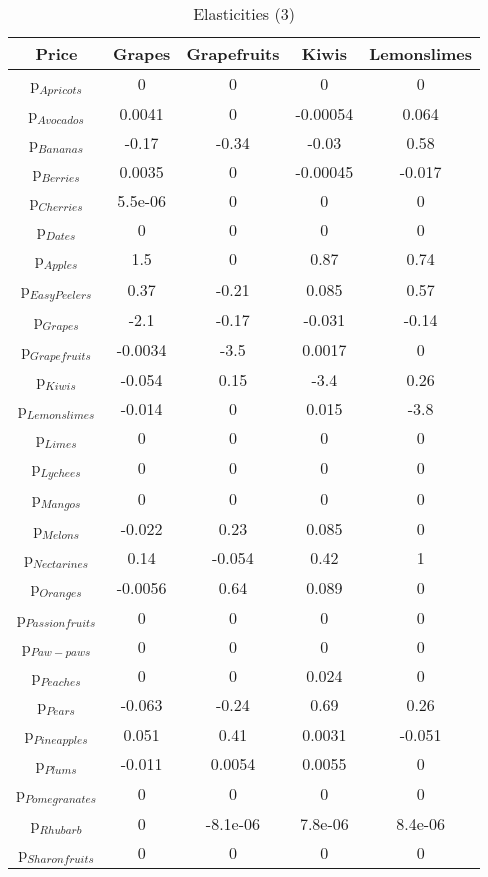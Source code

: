\documentclass[11pt]{article}
\begin{document}
\begin{table}[h]
\caption{Elasticities (3)}
\label{Table: elasticities 3}
\begin{center}
\begin{tabular}{ccccc}
Price & Grapes & Grapefruits & Kiwis & Lemonslimes \\ \hline
p$_{Apricots}$ & 0 & 0 & 0 & 0 \\ 
p$_{Avocados}$ & 0.0041 & 0 & -0.00054 & 0.064 \\ 
p$_{Bananas}$ & -0.17 & -0.34 & -0.03 & 0.58 \\ 
p$_{Berries}$ & 0.0035 & 0 & -0.00045 & -0.017 \\ 
p$_{Cherries}$ & 5.5e-06 & 0 & 0 & 0 \\ 
p$_{Dates}$ & 0 & 0 & 0 & 0 \\ 
p$_{Apples}$ & 1.5 & 0 & 0.87 & 0.74 \\ 
p$_{Easy Peelers}$ & 0.37 & -0.21 & 0.085 & 0.57 \\ 
p$_{Grapes}$ & -2.1 & -0.17 & -0.031 & -0.14 \\ 
p$_{Grapefruits}$ & -0.0034 & -3.5 & 0.0017 & 0 \\ 
p$_{Kiwis}$ & -0.054 & 0.15 & -3.4 & 0.26 \\ 
p$_{Lemonslimes}$ & -0.014 & 0 & 0.015 & -3.8 \\ 
p$_{Limes}$ & 0 & 0 & 0 & 0 \\ 
p$_{Lychees}$ & 0 & 0 & 0 & 0 \\ 
p$_{Mangos}$ & 0 & 0 & 0 & 0 \\ 
p$_{Melons}$ & -0.022 & 0.23 & 0.085 & 0 \\ 
p$_{Nectarines}$ & 0.14 & -0.054 & 0.42 & 1 \\ 
p$_{Oranges}$ & -0.0056 & 0.64 & 0.089 & 0 \\ 
p$_{Passion fruits}$ & 0 & 0 & 0 & 0 \\ 
p$_{Paw-paws}$ & 0 & 0 & 0 & 0 \\ 
p$_{Peaches}$ & 0 & 0 & 0.024 & 0 \\ 
p$_{Pears}$ & -0.063 & -0.24 & 0.69 & 0.26 \\ 
p$_{Pineapples}$ & 0.051 & 0.41 & 0.0031 & -0.051 \\ 
p$_{Plums}$ & -0.011 & 0.0054 & 0.0055 & 0 \\ 
p$_{Pomegranates}$ & 0 & 0 & 0 & 0 \\ 
p$_{Rhubarb}$ & 0 & -8.1e-06 & 7.8e-06 & 8.4e-06 \\ 
p$_{Sharon fruits}$ & 0 & 0 & 0 & 0 \\ 
\end{tabular}
\end{center}
\end{table}
\end{document}
